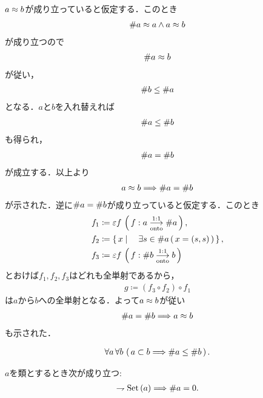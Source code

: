 	\begin{prf}
		$a \approx b$が成り立っていると仮定する．このとき
		\begin{align}
			\# a \approx a \wedge a \approx b
		\end{align}
		が成り立つので
		\begin{align}
			\# a \approx b
		\end{align}
		が従い，
		\begin{align}
			\# b \leq \# a
		\end{align}
		となる．$a$と$b$を入れ替えれば
		\begin{align}
			\# a \leq \# b
		\end{align}
		も得られ，
		\begin{align}
			\# a = \# b
		\end{align}
		が成立する．以上より
		\begin{align}
			a \approx b \Longrightarrow \# a = \# b
		\end{align}
		が示された．逆に$\# a = \# b$が成り立っていると仮定する．このとき
		\begin{align}
			f_1 &\coloneqq \varepsilon f\, \left(\, f:a \underset{\mathrm{onto}}{\overset{\mathrm{1:1}}{\longrightarrow}} \# a\, \right), \\
			f_2 &\coloneqq \left\{\, x \mid \quad \exists s \in \# a\, (\,x = (s,s)\, )\, \right\}, \\
			f_3 &\coloneqq \varepsilon f\, \left(\, f:\# b \underset{\mathrm{onto}}{\overset{\mathrm{1:1}}{\longrightarrow}} b\, \right)
		\end{align}
		とおけば$f_1,f_2,f_3$はどれも全単射であるから，
		\begin{align}
			g \coloneqq (f_3 \circ f_2) \circ f_1
		\end{align}
		は$a$から$b$への全単射となる．よって$a \approx b$が従い
		\begin{align}
			\# a = \# b \Longrightarrow a \approx b
		\end{align}
		も示された．
		\QED
	\end{prf}
	
	\begin{screen}
		\begin{thm}
			\begin{align}
				\forall a\, \forall b\, \left(\, a \subset b \Longrightarrow \# a \leq \# b\, \right).
			\end{align}
		\end{thm}
	\end{screen}
	
	\begin{screen}
		\begin{thm}[真類の濃度は$0$]
			$a$を類とするとき次が成り立つ:
			\begin{align}
				\rightharpoondown \operatorname*{Set} \left(a\right) \Longrightarrow \# a = 0.
			\end{align}
		\end{thm}
	\end{screen}
	
